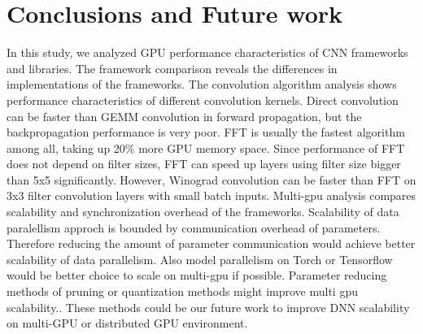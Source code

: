 \section{Conclusions and Future work}

In this study, we analyzed GPU performance characteristics of CNN frameworks and libraries.
The framework comparison reveals the differences in implementations of the frameworks.
The convolution algorithm analysis shows performance characteristics of different convolution kernels.
Direct convolution can be faster than GEMM convolution in forward propagation, but the backpropagation performance is very poor.
FFT is usually the fastest algorithm among all, taking up 20\% more GPU memory space.
Since performance of FFT does not depend on filter sizes, FFT can speed up layers using filter size bigger than 5x5 significantly.
However, Winograd convolution can be faster than FFT on 3x3 filter convolution layers with small batch inputs.
Multi-gpu analysis compares scalability and synchronization overhead of the frameworks.
Scalability of data paralellism approch is bounded by communication overhead of parameters.
Therefore reducing the amount of parameter communication would achieve better scalability of data parallelism.
Also model parallelism on Torch or Tensorflow would be better choice to scale on multi-gpu if possible.
Parameter reducing methods of pruning or quantization methods might improve multi gpu scalability.\cite{squeezenet, deepcompression}.
These methods could be our future work to improve DNN scalability on multi-GPU or distributed GPU environment.